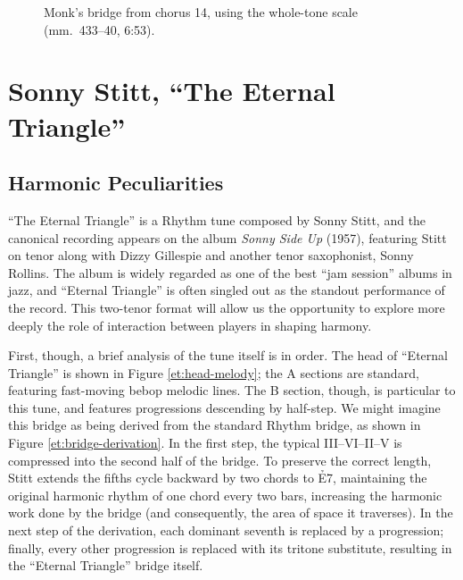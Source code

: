 \begin{figure}[tbp]
  \caption[Monk's bridge from chorus 14, using the whole-tone scale.]{%
    Monk's bridge from chorus 14, using the whole-tone scale (mm.~433--40, 6:53).}
  \label{ran:monk-wt-bridge}
\end{figure}


\section{Sonny Stitt, “The Eternal Triangle”}
\label{sec:eternal-triangle}

\subsection{Harmonic Peculiarities}

``The Eternal Triangle'' is a Rhythm tune composed by Sonny Stitt, and the
canonical recording appears on the album \emph{Sonny Side Up} (1957),
featuring Stitt on tenor along with Dizzy Gillespie and another tenor
saxophonist, Sonny Rollins.\nocite{gillespie:sonnyside} The album is widely
regarded as one of the best ``jam session'' albums in jazz, and ``Eternal
Triangle'' is often singled out as the standout performance of the
record. This two-tenor format will allow us the opportunity to
explore more deeply the role of interaction between players in shaping
harmony.

First, though, a brief analysis of the tune itself is in order. The head of
``Eternal Triangle'' is shown in Figure \ref{et:head-melody}; the A sections
are standard, featuring fast-moving bebop melodic lines. The B section,
though, is particular to this tune, and features \tf progressions descending
by half-step. We might imagine this bridge as being derived from the standard
Rhythm bridge, as shown in Figure \ref{et:bridge-derivation}. In the first
step, the typical III--VI--II--V is compressed into the second half of the
bridge. To preserve the correct length, Stitt extends the fifths cycle
backward by two chords to \h{E7}, maintaining the original harmonic rhythm of
one chord every two bars, increasing the harmonic work done by the bridge (and
consequently, the area of \tf space it traverses). In the next step of the
derivation, each dominant seventh is replaced by a \tf progression;
finally, every other \tf progression is replaced with its tritone
substitute, resulting in the ``Eternal Triangle'' bridge itself.


